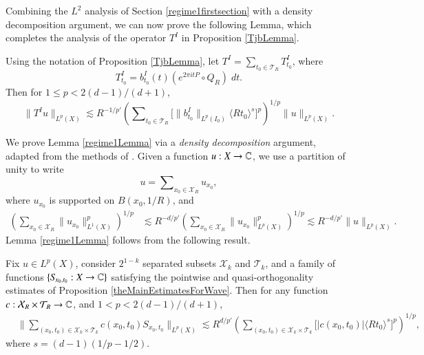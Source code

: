 Combining the $L^2$ analysis of Section \ref{regime1firstsection} with a density decomposition argument, we can now prove the following Lemma, which completes the analysis of the operator $T^I$ in Proposition \ref{TjbLemma}.

\begin{lemma} \label{regime1Lemma}
    Using the notation of Proposition \ref{TjbLemma}, let $T^I = \sum\nolimits_{t_0 \in \mathcal{T}_R} T^I_{t_0}$, where
    \[ T^I_{t_0} = b_{t_0}^I(t) (e^{2 \pi i t P} \circ Q_R)\; dt. \]
    Then for $1 \leq p < 2 (d-1) / (d+1)$,
    \[ \| T^I u \|_{L^p(X)} \lesssim R^{-1/p'} \left( \sum\nolimits_{t_0 \in \mathcal{T}_R} \Big[ \| b^I_{t_0} \|_{L^p(I_0)} \langle R t_0 \rangle^{s} \Big]^p \right)^{1/p} \| u \|_{L^p(X)}. \]
\end{lemma}

We prove Lemma \ref{regime1Lemma} via a \emph{density decomposition} argument, adapted from the methods of \cite{HeoandNazarovandSeeger}. Given a function $u: X \to \operatorname{\mathbb{C}}$, we use a partition of unity to write
%
\begin{equation}
    u = \sum\nolimits_{x_0 \in \mathcal{X}_R} u_{x_0},
\end{equation}
%
where $u_{x_0}$ is supported on $B(x_0,1/R)$, and
%
\begin{equation}
\begin{split}
    \left( \sum\nolimits_{x_0 \in \mathcal{X}_R} \| u_{x_0} \|_{L^1(X)}^p \right)^{1/p} &\lesssim R^{-d/p'} \left( \sum\nolimits_{x_0 \in \mathcal{X}_R} \| u_{x_0} \|_{L^p(X)}^p \right)^{1/p} \lesssim R^{-d/p'} \| u \|_{L^p(X)}.
\end{split}
\end{equation}
Lemma \ref{regime1Lemma} follows from the following result.

\begin{lemma} \label{LpBoundLemma}
    Fix $u \in L^p(X)$, consider $2^{1-k}$ separated subsets $\mathcal{X}_k$ and $\mathcal{T}_k$, and a family of functions $\{ S\!_{x_0,t_0} : X \to \operatorname{\mathbb{C}} \}$  satisfying the pointwise and quasi-orthogonality estimates of Proposition \ref{theMainEstimatesForWave}. Then for any function $c: \mathcal{X}_R \times \mathcal{T}_R \to \operatorname{\mathbb{C}}$, and $1 < p < 2 (d-1) / (d+1)$,
    \begin{align*}
    &\Bigg\| \sum\nolimits_{(x_0,t_0) \in \mathcal{X}_k \times \mathcal{T}_k} c(x_0,t_0) S\!_{x_0,t_0} \Big\|_{L^p(X)} \lesssim R^{d/p'} \left( \sum\nolimits_{(x_0,t_0) \in \mathcal{X}_k \times \mathcal{T}_k} \Big[ |c(x_0,t_0)| \langle R t_0 \rangle^{s} \Big]^p \right)^{1/p},
    \end{align*}
    where $s = (d-1)(1/p - 1/2)$.
\end{lemma}


